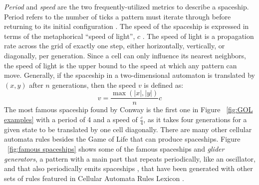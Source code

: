 \documentclass[12pt]{article}
\numberwithin{figure}{section} %
\begin{document}
\textit{Period} and \textit{speed} are the two frequently-utilized metrics to describe a spaceship. Period refers to the number of ticks a pattern must iterate through before returning to its initial configuration \cite{The Game of Life}. The speed of the spaceship is expressed in terms of the metaphorical “speed of light”, $c$ \cite{spaceship, speed of light}. The speed of light is a propagation rate across the grid of exactly one step, either horizontally, vertically, or diagonally, per generation. Since a cell can only influence its nearest neighbors, the speed of light is the upper bound to the speed at which any pattern can move. Generally, if the spaceship in a two-dimensional automaton is translated by $(x,y)$ after $n$ generations, then the speed $v$ is defined as: 
$$v = \frac{\max{(|x|, |y|)}}{n}c$$
The most famous spaceship found by Conway is the first one in Figure ~\ref{fig:GOL examples} with a period of 4 and a speed of $\frac{c}{4}$, as it takes four generations for a given state to be translated by one cell diagonally. There are many other cellular automata rules besides the Game of Life that can produce spaceships. Figure ~\ref{fig:famous spaceships} shows some of the famous spaceships and \textit{glider generators}, a pattern with a main part that repeats periodically, like an oscillator, and that also periodically emits spaceships \cite{gun}, that have been generated with other sets of rules featured in Cellular Automata Rules Lexicon \cite{Lexicon}. 
\end{document}
